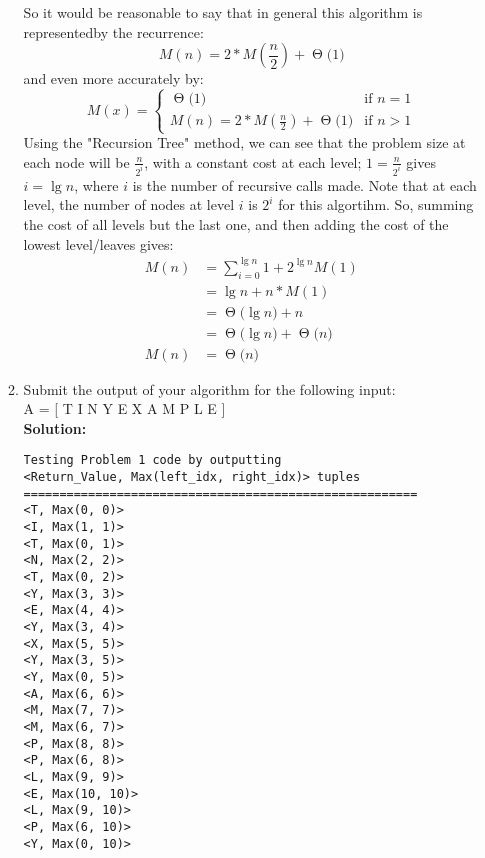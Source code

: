 \documentclass[11pts]{article}
\newcommand{\BigTheta}[1]{\ensuremath{\operatorname{\Theta}\bigl(#1\bigr)}}
\begin{document}
\begin{enumerate}
\begin{enumerate}
    So it would be reasonable to say that in general this algorithm is
    representedby the recurrence: 
    \[ M(n) = 2 * M(\frac{n}{2}) + \BigTheta{1} \]
    and even more accurately by:
    \begin{equation*}
    M(x) = \left\{
          \begin{array}{rl}
          \BigTheta{1}                             & \text{if } n = 1 \\
          M(n) = 2 * M(\frac{n}{2}) + \BigTheta{1} & \text{if } n > 1
          \end{array} \right.
    \end{equation*}
    Using the "Recursion Tree" method, we can see that the problem size at
    each node will be $\frac{n}{2^{i}}$, with a constant cost at each level;
    $1 = \frac{n}{2^{i}}$
    gives $i = \lg{n}$, where $i$ is the number of recursive calls made.
    Note that at each level, the number of nodes at level $i$ is $2^i$ for
    this algortihm.
    So, summing the cost of all levels but the last one, and then adding
    the cost of the lowest level/leaves gives:
    \begin{align*}
      M(n) &= \sum_{i=0}^{\lg{n}}{1} + 2^{\lg{n}}M(1) \\
           &= \lg{n} + n * M(1) \\
           &= \BigTheta{\lg{n}} + n \\
           &= \BigTheta{\lg{n}} + \BigTheta{n} \\
      M(n) &= \BigTheta{n}
    \end{align*}

\newpage
  \item Submit the output of your algorithm for the following input: \\
        A = [ T I N Y E X A M P L E ] \\

  \textbf{Solution:}
    \begin{verbatim}
Testing Problem 1 code by outputting
<Return_Value, Max(left_idx, right_idx)> tuples
=======================================================
<T, Max(0, 0)>
<I, Max(1, 1)>
<T, Max(0, 1)>
<N, Max(2, 2)>
<T, Max(0, 2)>
<Y, Max(3, 3)>
<E, Max(4, 4)>
<Y, Max(3, 4)>
<X, Max(5, 5)>
<Y, Max(3, 5)>
<Y, Max(0, 5)>
<A, Max(6, 6)>
<M, Max(7, 7)>
<M, Max(6, 7)>
<P, Max(8, 8)>
<P, Max(6, 8)>
<L, Max(9, 9)>
<E, Max(10, 10)>
<L, Max(9, 10)>
<P, Max(6, 10)>
<Y, Max(0, 10)>
    \end{verbatim}


\end{enumerate}
\end{enumerate}
\end{document}
